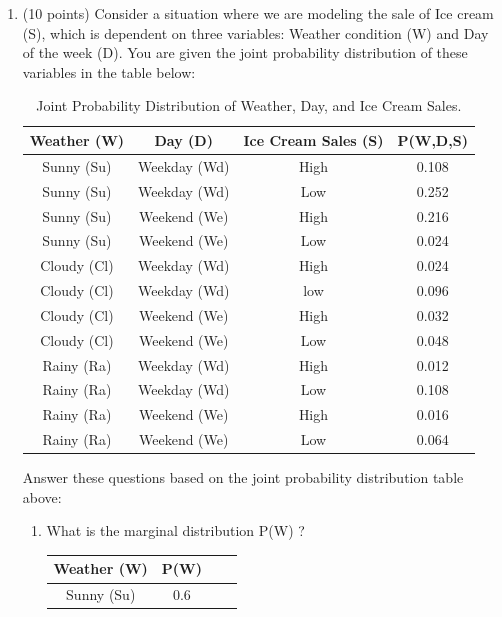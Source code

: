 \documentclass[12pt]{article}
\newenvironment{qparts}{\begin{enumerate}[{(}a{)}]}{\end{enumerate}}
\newenvironment{qsubparts}{\begin{enumerate}[{(}i{)}]}{\end{enumerate}}
\begin{document}
\begin{qparts}


  \item (10 points) Consider a situation where we are modeling the sale of Ice cream (S), which is dependent on three variables: Weather condition (W) and Day of the week (D). You are given the joint probability distribution of these variables in the table below:

  \begin{table}[h]
    \centering
    \begin{tabular}{|c|c|c|c|}
      \hline
      Weather (W) & Day (D)      & Ice Cream Sales (S) & P(W,D,S) \\ \hline \hline
      Sunny (Su)  & Weekday (Wd) & High                & 0.108    \\ \hline
      Sunny (Su)  & Weekday (Wd) & Low                 & 0.252    \\ \hline
      Sunny (Su)  & Weekend (We) & High                & 0.216    \\ \hline
      Sunny (Su)  & Weekend (We) & Low                 & 0.024    \\ \hline
      Cloudy (Cl) & Weekday (Wd) & High                & 0.024    \\ \hline
      Cloudy (Cl) & Weekday (Wd) & low                 & 0.096    \\ \hline
      Cloudy (Cl) & Weekend (We) & High                & 0.032    \\ \hline
      Cloudy (Cl) & Weekend (We) & Low                 & 0.048    \\ \hline
      Rainy (Ra)  & Weekday (Wd) & High                & 0.012    \\ \hline
      Rainy (Ra)  & Weekday (Wd) & Low                 & 0.108    \\ \hline
      Rainy (Ra)  & Weekend (We) & High                & 0.016    \\ \hline
      Rainy (Ra)  & Weekend (We) & Low                 & 0.064    \\ \hline
      \hline
    \end{tabular}
    \caption{Joint Probability Distribution of Weather, Day, and Ice Cream Sales. }
    \label{tab:my_label}
  \end{table}

  Answer these questions based on the joint probability distribution table above:
  \begin{qsubparts}
    \item What is the marginal distribution  P(W) ?\\
    \begin{table}[h]
      \centering
      \begin{tabular}{|c|c|c|c|}
        \hline
        Weather (W) & P(W) \\ \hline \hline
        Sunny (Su)  & 0.6  \\ \hline


\end{tabular}
\end{table}
\end{qsubparts}
\end{qparts}
\end{document}
